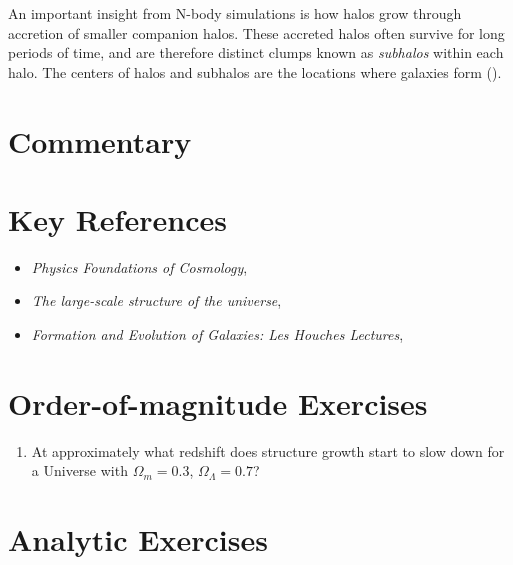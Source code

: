 An important insight from N-body simulations is how halos grow through
accretion of smaller companion halos. These accreted halos often
survive for long periods of time, and are therefore distinct clumps
known as {\it subhalos} within each halo. The centers of halos and
subhalos are the locations where galaxies form (\citealt{wechsler18a}).


\section{Commentary}


\section{Key References}

\begin{itemize}
  \item
    {\it Physics Foundations of Cosmology},
    \citet{mukhanov05a}
  \item
    {\it The large-scale structure of the
    universe}, \citet{peebles80a}
  \item
    {\it Formation and Evolution of Galaxies: Les Houches
    Lectures}, \citet{white94a} 
\end{itemize}

\section{Order-of-magnitude Exercises}

\begin{enumerate} 
\item At approximately what redshift does structure growth start to
    slow down for a Universe with $\Omega_m = 0.3$, $\Omega_\Lambda = 0.7$?
\end{enumerate} 

\section{Analytic Exercises}

